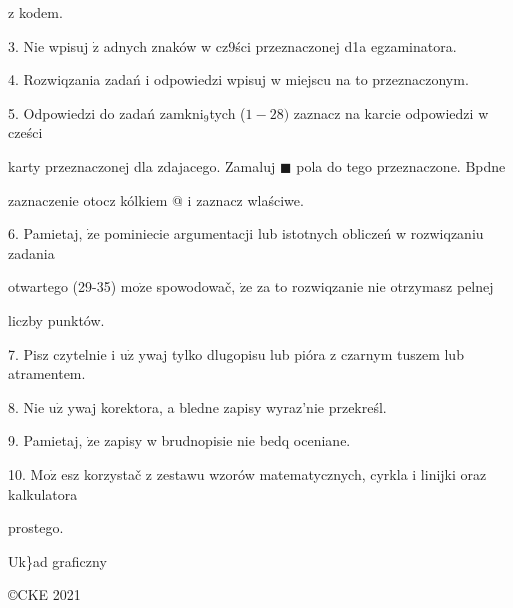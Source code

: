 \documentclass[a4paper,12pt]{article}
\begin{document}
z kodem.

3. Nie wpisuj $\dot{\mathrm{z}}$ adnych znaków w cz9ści przeznaczonej d1a egzaminatora.

4. Rozwiqzania zadań i odpowiedzi wpisuj w miejscu na to przeznaczonym.

5. Odpowiedzi do zadań $\mathrm{z}\mathrm{a}\mathrm{m}\mathrm{k}\mathrm{n}\mathrm{i}_{9}$tych ($1-28)$ zaznacz na karcie odpowiedzi w cześci

karty przeznaczonej dla zdajacego. Zamaluj $\blacksquare$ pola do tego przeznaczone. $\mathrm{B}$pdne

zaznaczenie otocz kólkiem @ i zaznacz wlaściwe.

6. Pamietaj, $\dot{\mathrm{z}}\mathrm{e}$ pominiecie argumentacji lub istotnych obliczeń w rozwiqzaniu zadania

otwartego (29-35) $\mathrm{m}\mathrm{o}\dot{\mathrm{z}}\mathrm{e}$ spowodowač, $\dot{\mathrm{z}}\mathrm{e}$ za to rozwiqzanie nie otrzymasz pelnej

liczby punktów.

7. Pisz czytelnie i $\mathrm{u}\dot{\mathrm{z}}$ ywaj tylko dlugopisu lub pióra z czarnym tuszem lub atramentem.

8. Nie $\mathrm{u}\dot{\mathrm{z}}$ ywaj korektora, a bledne zapisy wyraz'nie przekreśl.

9. Pamietaj, $\dot{\mathrm{z}}\mathrm{e}$ zapisy w brudnopisie nie bedq oceniane.

10. $\mathrm{M}\mathrm{o}\dot{\mathrm{z}}$ esz korzystač z zestawu wzorów matematycznych, cyrkla i linijki oraz kalkulatora

prostego.

Uk\}ad graficzny

\copyright CKE 2021
\end{document}
